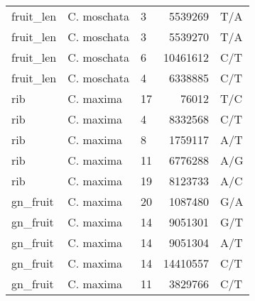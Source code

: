 \begin{table}[ht]
\begin{tabular}{lllrl}
  fruit\_len & C. moschata & 3 & 5539269 & T/A \\ 
  fruit\_len & C. moschata & 3 & 5539270 & T/A \\ 
  fruit\_len & C. moschata & 6 & 10461612 & C/T \\ 
  fruit\_len & C. moschata & 4 & 6338885 & C/T \\ 
  rib & C. maxima & 17 & 76012 & T/C \\ 
  rib & C. maxima & 4 & 8332568 & C/T \\ 
  rib & C. maxima & 8 & 1759117 & A/T \\ 
  rib & C. maxima & 11 & 6776288 & A/G \\ 
  rib & C. maxima & 19 & 8123733 & A/C \\ 
  gn\_fruit & C. maxima & 20 & 1087480 & G/A \\ 
  gn\_fruit & C. maxima & 14 & 9051301 & G/T \\ 
  gn\_fruit & C. maxima & 14 & 9051304 & A/T \\ 
  gn\_fruit & C. maxima & 14 & 14410557 & C/T \\ 
  gn\_fruit & C. maxima & 11 & 3829766 & C/T \\ 
   \hline
\end{tabular}
\end{table}
